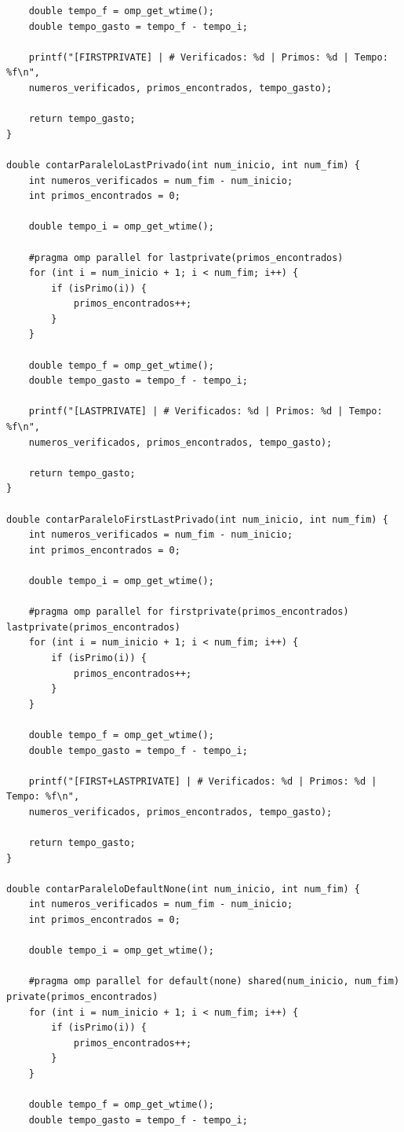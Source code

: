 \documentclass[12pt, openright, oneside, a4paper, brazil]{article}
\begin{document}
\begin{lstlisting}
	double tempo_f = omp_get_wtime();
	double tempo_gasto = tempo_f - tempo_i;
	
	printf("[FIRSTPRIVATE] | # Verificados: %d | Primos: %d | Tempo: %f\n",
	numeros_verificados, primos_encontrados, tempo_gasto);
	
	return tempo_gasto;
}

double contarParaleloLastPrivado(int num_inicio, int num_fim) {
	int numeros_verificados = num_fim - num_inicio;
	int primos_encontrados = 0;
	
	double tempo_i = omp_get_wtime();
	
	#pragma omp parallel for lastprivate(primos_encontrados)
	for (int i = num_inicio + 1; i < num_fim; i++) {
		if (isPrimo(i)) {
			primos_encontrados++;
		}
	}
	
	double tempo_f = omp_get_wtime();
	double tempo_gasto = tempo_f - tempo_i;
	
	printf("[LASTPRIVATE] | # Verificados: %d | Primos: %d | Tempo: %f\n",
	numeros_verificados, primos_encontrados, tempo_gasto);
	
	return tempo_gasto;
}

double contarParaleloFirstLastPrivado(int num_inicio, int num_fim) {
	int numeros_verificados = num_fim - num_inicio;
	int primos_encontrados = 0;
	
	double tempo_i = omp_get_wtime();
	
	#pragma omp parallel for firstprivate(primos_encontrados) lastprivate(primos_encontrados)
	for (int i = num_inicio + 1; i < num_fim; i++) {
		if (isPrimo(i)) {
			primos_encontrados++;
		}
	}
	
	double tempo_f = omp_get_wtime();
	double tempo_gasto = tempo_f - tempo_i;
	
	printf("[FIRST+LASTPRIVATE] | # Verificados: %d | Primos: %d | Tempo: %f\n",
	numeros_verificados, primos_encontrados, tempo_gasto);
	
	return tempo_gasto;
}

double contarParaleloDefaultNone(int num_inicio, int num_fim) {
	int numeros_verificados = num_fim - num_inicio;
	int primos_encontrados = 0;
	
	double tempo_i = omp_get_wtime();
	
	#pragma omp parallel for default(none) shared(num_inicio, num_fim) private(primos_encontrados)
	for (int i = num_inicio + 1; i < num_fim; i++) {
		if (isPrimo(i)) {
			primos_encontrados++;
		}
	}
	
	double tempo_f = omp_get_wtime();
	double tempo_gasto = tempo_f - tempo_i;
	

\end{lstlisting}
\end{document}
